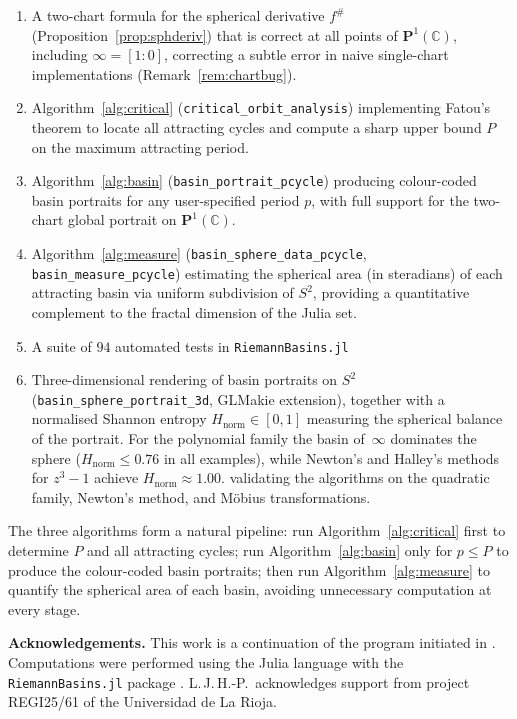 \documentclass[12pt]{article}
\theoremstyle{definition}
\newcommand{\C}{\mathbb{C}}
\newcommand{\Pone}{\mathbf{P}^1(\C)}
\newcommand{\fsh}{f^{\#}}
\begin{document}
\begin{enumerate}
  \item A two-chart formula for the spherical derivative $\fsh$
        (Proposition~\ref{prop:sphderiv}) that is correct at all points of
        $\Pone$, including $\infty=[1:0]$, correcting a subtle error in
        naive single-chart implementations (Remark~\ref{rem:chartbug}).

  \item Algorithm~\ref{alg:critical} (\texttt{critical\_orbit\_analysis})
        implementing Fatou's theorem to locate all attracting cycles and
        compute a sharp upper bound $P$ on the maximum attracting period.

  \item Algorithm~\ref{alg:basin} (\texttt{basin\_portrait\_pcycle})
        producing colour-coded basin portraits for any user-specified period
        $p$, with full support for the two-chart global portrait on $\Pone$.

  \item Algorithm~\ref{alg:measure} (\texttt{basin\_sphere\_data\_pcycle},
        \texttt{basin\_measure\_pcycle}) estimating the spherical area
        (in steradians) of each attracting basin via uniform subdivision of
        $S^2$, providing a quantitative complement to the fractal dimension
        of the Julia set.

  \item A suite of $94$ automated tests in \texttt{RiemannBasins.jl}

  \item Three-dimensional rendering of basin portraits on $S^2$
        (\texttt{basin\_sphere\_portrait\_3d}, GLMakie extension), together
        with a normalised Shannon entropy $H_{\mathrm{norm}}\in[0,1]$
        measuring the spherical balance of the portrait.  For the polynomial
        family the basin of~$\infty$ dominates the sphere
        ($H_{\mathrm{norm}}\leq 0.76$ in all examples), while Newton's and
        Halley's methods for $z^3-1$ achieve $H_{\mathrm{norm}}\approx 1.00$.
        validating the algorithms on the quadratic family, Newton's method,
        and M\"obius transformations.
\end{enumerate}

The three algorithms form a natural pipeline: run Algorithm~\ref{alg:critical}
first to determine $P$ and all attracting cycles; run Algorithm~\ref{alg:basin}
only for $p\leq P$ to produce the colour-coded basin portraits; then run
Algorithm~\ref{alg:measure} to quantify the spherical area of each basin,
avoiding unnecessary computation at every stage.

\bigskip
\noindent\textbf{Acknowledgements.}
This work is a continuation of the program
initiated in \cite{Extremiana2019,AlvarezAparicio2023}.  Computations were
performed using the Julia language \cite{Julia2017} with the
\texttt{RiemannBasins.jl} package \cite{RiemannBasins}.
L.\,J.\,H.-P.\ acknowledges support from project REGI25/61 of the
Universidad de La Rioja.



\end{document}
